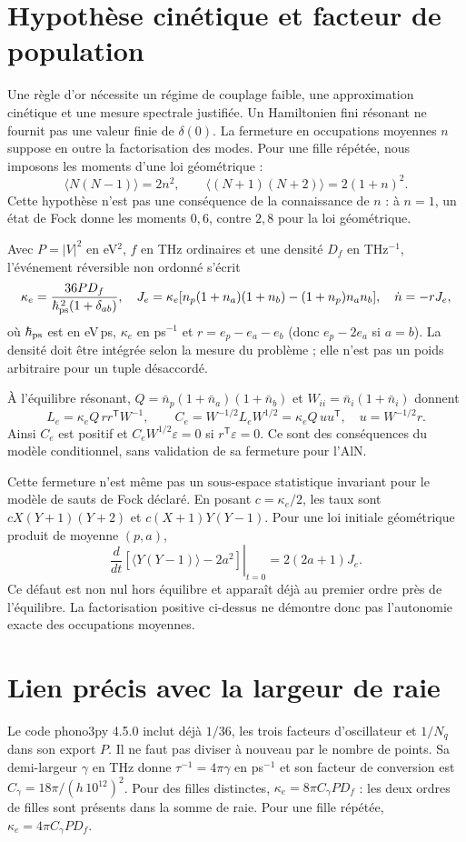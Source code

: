 \documentclass[11pt,a4paper]{article}
\begin{document}
\section{Hypothèse cinétique et facteur de population}
Une règle d'or nécessite un régime de couplage faible, une approximation
cinétique et une mesure spectrale justifiée. Un Hamiltonien fini résonant
ne fournit pas une valeur finie de $\delta(0)$.
La fermeture en occupations moyennes $n$ suppose en outre la
factorisation des modes. Pour une fille répétée, nous imposons les
moments d'une loi géométrique :
\[
 \langle N(N-1)\rangle=2n^2,\qquad
 \langle(N+1)(N+2)\rangle=2(1+n)^2.
\]
Cette hypothèse n'est pas une conséquence de la connaissance de $n$ :
à $n=1$, un état de Fock donne les moments $0,6$, contre $2,8$
pour la loi géométrique.

Avec $P=|V|^2$ en eV$^2$, $f$ en THz ordinaires et une densité
$D_f$ en THz$^{-1}$, l'événement réversible non ordonné s'écrit
\[
 \kappa_e=\frac{36P D_f}{\hbar_{\rm ps}^{\,2}(1+\delta_{ab})},
 \quad
 J_e=\kappa_e[n_p(1+n_a)(1+n_b)-(1+n_p)n_an_b],
 \quad \dot n=-rJ_e,
\]
où $\hbar_{\rm ps}$ est en eV\,ps, $\kappa_e$ en ps$^{-1}$ et
$r=e_p-e_a-e_b$ (donc $e_p-2e_a$ si $a=b$).
La densité doit être intégrée selon la mesure du problème ; elle n'est
pas un poids arbitraire pour un tuple désaccordé.

À l'équilibre résonant, $Q=\bar n_p(1+\bar n_a)(1+\bar n_b)$ et
$W_{ii}=\bar n_i(1+\bar n_i)$ donnent
\[
 L_e=\kappa_e Q\,rr^{\mathsf T}W^{-1},\qquad
 C_e=W^{-1/2}L_eW^{1/2}
     =\kappa_e Q\,uu^{\mathsf T},\quad u=W^{-1/2}r.
\]
Ainsi $C_e$ est positif et $C_eW^{1/2}\varepsilon=0$ si
$r^{\mathsf T}\varepsilon=0$. Ce sont des conséquences du modèle
conditionnel, sans validation de sa fermeture pour l'AlN.

Cette fermeture n'est même pas un sous-espace statistique invariant
pour le modèle de sauts de Fock déclaré. En posant $c=\kappa_e/2$,
les taux sont $cX(Y+1)(Y+2)$ et $c(X+1)Y(Y-1)$. Pour une loi
initiale géométrique produit de moyenne $(p,a)$,
\[
 \left.\frac{d}{dt}
 [\langle Y(Y-1)\rangle-2a^2]\right|_{t=0}
 =2(2a+1)J_e.
\]
Ce défaut est non nul hors équilibre et apparaît déjà au premier ordre
près de l'équilibre. La factorisation positive ci-dessus ne démontre
donc pas l'autonomie exacte des occupations moyennes.

\section{Lien précis avec la largeur de raie}
Le code phono3py 4.5.0 inclut déjà $1/36$, les trois facteurs
d'oscillateur et $1/N_q$ dans son export $P$. Il ne faut pas diviser
à nouveau par le nombre de points.
Sa demi-largeur $\gamma$ en THz donne $\tau^{-1}=4\pi\gamma$ en
ps$^{-1}$ et son facteur de conversion est
$C_\gamma=18\pi/(h\,10^{12})^2$.
Pour des filles distinctes, $\kappa_e=8\pi C_\gamma P D_f$ :
les deux ordres de filles sont présents dans la somme de raie.
Pour une fille répétée, $\kappa_e=4\pi C_\gamma P D_f$.
\end{document}
